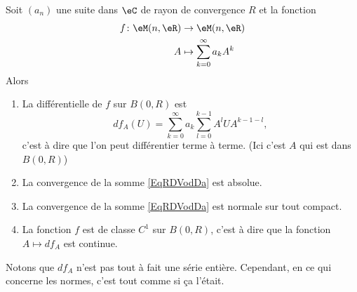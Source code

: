 \begin{proposition} \label{PropAMBXKgV}
    Soit \( (a_n)\) une suite dans \( \eC\) de rayon de convergence \( R\) et la fonction
    \begin{equation}
        \begin{aligned}
            f\colon \eM(n,\eR)&\to \eM(n,\eR) \\
            A&\mapsto \sum_{k=0}^{\infty}a_kA^k 
        \end{aligned}
    \end{equation}
    Alors
    \begin{enumerate}
        \item
            La différentielle de \( f\) sur \( B(0,R)\) est
            \begin{equation}    \label{EqRDVodDa}
                df_A(U)=\sum_{k=0}^{\infty}a_k\sum_{l=0}^{k-1}A^lUA^{k-1-l},
            \end{equation}
            c'est à dire que l'on peut différentier terme à terme. (Ici c'est \( A\) qui est dans \( B(0,R)\))
        \item
            La convergence de la somme \ref{EqRDVodDa} est absolue.
        \item
            La convergence de la somme \ref{EqRDVodDa} est normale sur tout compact.
        \item
            La fonction \( f\) est de classe \( C^1\) sur \( B(0,R)\), c'est à dire que la fonction \( A\mapsto df_A\) est continue.
    \end{enumerate}
\end{proposition}
Notons que \( df_A\) n'est pas tout à fait une série entière. Cependant, en ce qui concerne les normes, c'est tout comme si ça l'était.

